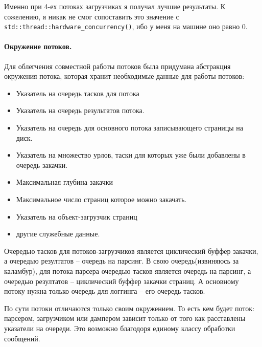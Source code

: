\documentclass[12pt]{article}
\begin{document}
Именно при 4-ех потоках загрузчиках я получал лучшие результаты. К сожелению, я
никак не смог сопоставить это значение с \verb|std::thread::hardware_concurrency()|,
ибо у меня на машине оно равно 0.

\paragraph{Окружение потоков.} Для облегчения совместной работы потоков 
была придумана абстракция окружения потока, которая хранит необходимые данные
для работы потоков:
\begin{itemize}
    \item Указатель на очередь тасков для потока
    \item Указатель на очередь результатов потока.
    \item Указатель на очередь для основного потока записывающего страницы на
          диск.
    \item Указатель на множество урлов, таски для которых уже были добавлены
          в очередь закачки.
    \item Максимальная глубина закачки
    \item Максимальное число страниц которое можно закачать.
    \item Указатель на объект-загрузчик страниц
    \item другие служебные данные.
\end{itemize}

Очередью тасков для потоков-загрузчиков является циклический буффер закачки,
а очередью резултатов -- очередь на парсинг.
В свою очередь(извиняюсь за каламбур), для потока парсера очередью тасков является
очередь на парсинг, а очередью резултатов -- циклический буффер закачки страниц.
А основному потоку нужна только очередь для логгинга -- его очередь тасков.

По сути потоки отличаются только своим окружением. То есть кем будет поток:
парсером, загрузчиком или дампером зависит только от того как расставлены указатели
на очереди. Это возможно благодоря единому классу обработки сообщений.
\end{document}

